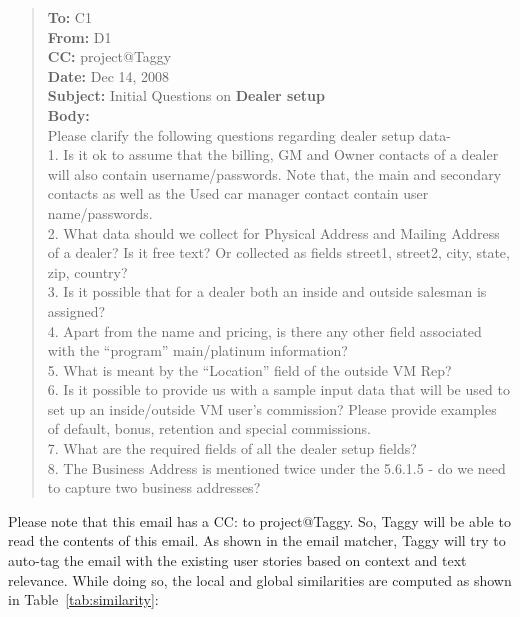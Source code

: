 \begin{quote}
	\textbf{To:} C1\\
	\textbf{From:} D1\\
	\textbf{CC:} project@Taggy\\
	\textbf{Date:} Dec 14, 2008\\
	\textbf{Subject:} Initial Questions on \textbf{Dealer setup}\\
	\textbf{Body:}\\
	Please clarify the following questions regarding dealer setup data-\\
	1. Is it ok to assume that the billing, GM and Owner contacts of a dealer will also contain username/passwords. Note that, the main and secondary contacts as well as the Used car manager contact contain user name/passwords.\\
	2. What data should we collect for Physical Address and Mailing Address of a dealer? Is it free text? Or collected as fields street1, street2, city, state, zip, country?\\
	3. Is it possible that for a dealer both an inside and outside salesman is assigned?\\
	4. Apart from the name and pricing, is there any other field associated with the ``program'' {main/platinum} information?\\
	5. What is meant by the ``Location'' field of the outside VM Rep?\\
	6. Is it possible to provide us with a sample input data that will be used to set up an inside/outside VM user's commission? Please provide examples of default, bonus, retention and special commissions.\\
	7. What are the required fields of all the dealer setup fields?\\
	8. The Business Address is mentioned twice under the 5.6.1.5 - do we need to capture two business addresses?
	\\
\end{quote}

Please note that this email has a CC: to project@Taggy. So, Taggy will be able to read the contents of this email. As shown in the email matcher, Taggy will try to auto-tag the email with the existing user stories based on context and text relevance. While doing so, the local and global similarities are computed as shown in Table~\ref{tab:similarity}:

